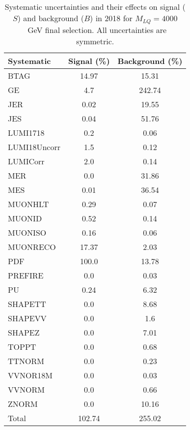 \begin{table}[htbp]
\begin{center}
\caption{Systematic uncertainties and their effects on signal ($S$) and background ($B$) in 2018 for $M_{LQ}=4000$~GeV final selection. All uncertainties are symmetric.}
\begin{tabular}{lcc}
\hline\hline
Systematic & Signal (\%) & Background (\%) \\ \hline 
BTAG & 14.97 & 15.31\\ 
GE & 4.7 & 242.74\\ 
JER & 0.02 & 19.55\\ 
JES & 0.04 & 51.76\\ 
LUMI1718 & 0.2 & 0.06\\ 
LUMI18Uncorr & 1.5 & 0.12\\ 
LUMICorr & 2.0 & 0.14\\ 
MER & 0.0 & 31.86\\ 
MES & 0.01 & 36.54\\ 
MUONHLT & 0.29 & 0.07\\ 
MUONID & 0.52 & 0.14\\ 
MUONISO & 0.16 & 0.06\\ 
MUONRECO & 17.37 & 2.03\\ 
PDF & 100.0 & 13.78\\ 
PREFIRE & 0.0 & 0.03\\ 
PU & 0.24 & 6.32\\ 
SHAPETT & 0.0 & 8.68\\ 
SHAPEVV & 0.0 & 1.6\\ 
SHAPEZ & 0.0 & 7.01\\ 
TOPPT & 0.0 & 0.68\\ 
TTNORM & 0.0 & 0.23\\ 
VVNOR18M & 0.0 & 0.03\\ 
VVNORM & 0.0 & 0.66\\ 
ZNORM & 0.0 & 10.16\\ 
Total & 102.74 & 255.02\\ \hline \hline
\end{tabular}
\label{tab:SysUncertainties_uujj_4000}
\end{center}
\end{table}

